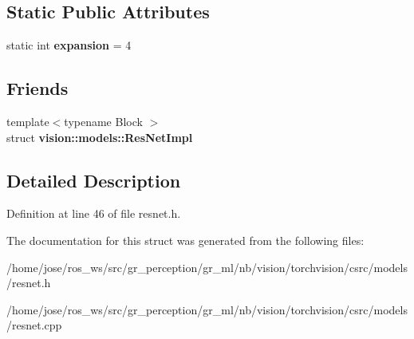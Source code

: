 \subsection*{Static Public Attributes}
\begin{DoxyCompactItemize}
\item 
\mbox{\label{structvision_1_1models_1_1__resnetimpl_1_1Bottleneck_ae52f0ec8f0659232e31e333850fe5338}} 
static int {\bfseries expansion} = 4
\end{DoxyCompactItemize}
\subsection*{Friends}
\begin{DoxyCompactItemize}
\item 
\mbox{\label{structvision_1_1models_1_1__resnetimpl_1_1Bottleneck_a2d4c95d61d2126a085e162451df61b9d}} 
{\footnotesize template$<$typename Block $>$ }\\struct {\bfseries vision\+::models\+::\+Res\+Net\+Impl}
\end{DoxyCompactItemize}


\subsection{Detailed Description}


Definition at line 46 of file resnet.\+h.



The documentation for this struct was generated from the following files\+:\begin{DoxyCompactItemize}
\item 
/home/jose/ros\+\_\+ws/src/gr\+\_\+perception/gr\+\_\+ml/nb/vision/torchvision/csrc/models/resnet.\+h\item 
/home/jose/ros\+\_\+ws/src/gr\+\_\+perception/gr\+\_\+ml/nb/vision/torchvision/csrc/models/resnet.\+cpp\end{DoxyCompactItemize}
